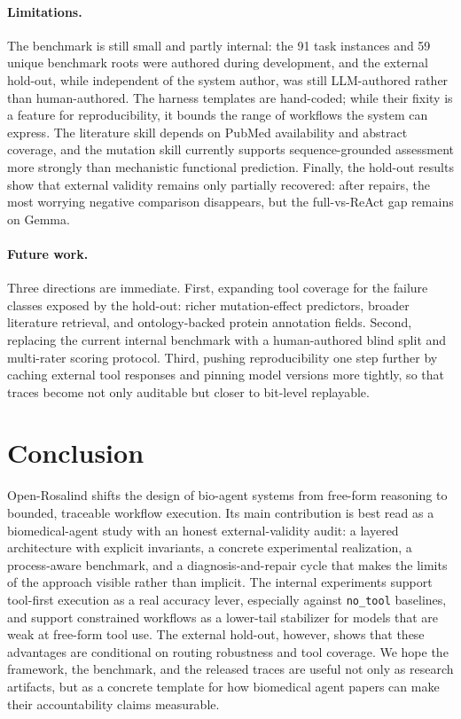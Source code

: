 \documentclass[11pt,letterpaper]{article}
\begin{document}
\paragraph{Limitations.}
The benchmark is still small and partly internal: the 91 task instances and 59 unique benchmark roots were authored during development, and the external hold-out, while independent of the system author, was still LLM-authored rather than human-authored. The harness templates are hand-coded; while their fixity is a feature for reproducibility, it bounds the range of workflows the system can express. The literature skill depends on PubMed availability and abstract coverage, and the mutation skill currently supports sequence-grounded assessment more strongly than mechanistic functional prediction. Finally, the hold-out results show that external validity remains only partially recovered: after repairs, the most worrying negative comparison disappears, but the full-vs-ReAct gap remains on Gemma.

\paragraph{Future work.}
Three directions are immediate. First, expanding tool coverage for the failure classes exposed by the hold-out: richer mutation-effect predictors, broader literature retrieval, and ontology-backed protein annotation fields. Second, replacing the current internal benchmark with a human-authored blind split and multi-rater scoring protocol. Third, pushing reproducibility one step further by caching external tool responses and pinning model versions more tightly, so that traces become not only auditable but closer to bit-level replayable.

\section{Conclusion}
\label{sec:conclusion}

Open-Rosalind shifts the design of bio-agent systems from free-form reasoning to bounded, traceable workflow execution. Its main contribution is best read as a biomedical-agent study with an honest external-validity audit: a layered architecture with explicit invariants, a concrete experimental realization, a process-aware benchmark, and a diagnosis-and-repair cycle that makes the limits of the approach visible rather than implicit. The internal experiments support tool-first execution as a real accuracy lever, especially against \texttt{no\_tool} baselines, and support constrained workflows as a lower-tail stabilizer for models that are weak at free-form tool use. The external hold-out, however, shows that these advantages are conditional on routing robustness and tool coverage. We hope the framework, the benchmark, and the released traces are useful not only as research artifacts, but as a concrete template for how biomedical agent papers can make their accountability claims measurable.
\end{document}
